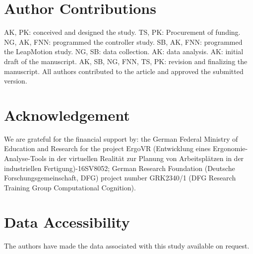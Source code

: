 \section*{Author Contributions}
AK, PK: conceived and designed the study. TS, PK: Procurement of funding. NG, AK, FNN: programmed the controller study. SB, AK, FNN: programmed the LeapMotion study. NG, SB: data collection. AK: data analysis. AK: initial draft of the manuscript. AK, SB, NG, FNN, TS, PK: revision and finalizing the manuscript. All authors contributed to the article and approved the submitted version.

\section*{Acknowledgement}
We are grateful for the financial support by: the German Federal Ministry of Education and Research for the project ErgoVR (Entwicklung eines Ergonomie-Analyse-Tools in der virtuellen Realität zur Planung von Arbeitsplätzen in der industriellen Fertigung)-16SV8052; German Research Foundation (Deutsche Forschungsgemeinschaft, DFG) project number GRK2340/1 (DFG Research Training Group Computational Cognition).

\section*{Data Accessibility}
The authors have made the data associated with this study available on request.



% 
